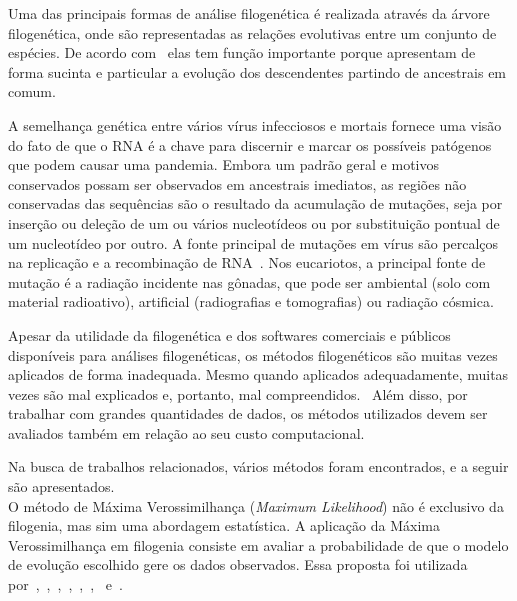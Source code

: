 \documentclass[font=plain]{abnt}
\begin{document}
Uma das principais formas de análise filogenética é realizada através da árvore filogenética, onde são representadas as relações evolutivas entre um conjunto de espécies. De acordo com~\cite{morrison_tree_thinking} elas tem função importante porque apresentam de forma sucinta e particular a evolução dos descendentes partindo de ancestrais em comum.

A semelhança genética entre vários vírus infecciosos e mortais fornece uma visão do fato de que o RNA é a chave para discernir e marcar os possíveis patógenos que podem causar uma pandemia. Embora um padrão geral e motivos conservados possam ser observados em ancestrais imediatos, as regiões não conservadas das sequências são o resultado da acumulação de mutações, seja por inserção ou deleção de um ou vários nucleotídeos ou por substituição pontual de um nucleotídeo por outro. A fonte principal de mutações em vírus são percalços na replicação e a recombinação de RNA~\cite[p. 11]{behl_threat_2022}. Nos eucariotos, a principal fonte de mutação é a radiação incidente nas gônadas, que pode ser ambiental (solo com material radioativo), artificial (radiografias e tomografias) ou radiação cósmica.

Apesar da utilidade da filogenética e dos softwares comerciais e públicos disponíveis para análises filogenéticas, os métodos filogenéticos são muitas vezes aplicados de forma inadequada. Mesmo quando aplicados adequadamente, muitas vezes são mal explicados e, portanto, mal compreendidos.~\cite[p. 1]{barry_phylogenetic_analysis_2006} Além disso, por trabalhar com grandes quantidades de dados, os métodos utilizados devem ser avaliados também em relação ao seu custo computacional.

Na busca de trabalhos relacionados, vários métodos foram encontrados, e a seguir são apresentados.\\
O método de Máxima Verossimilhança (\textit{Maximum Likelihood}) não é exclusivo da filogenia, mas sim uma abordagem estatística. A aplicação da Máxima Verossimilhança em filogenia consiste em avaliar a probabilidade de que o modelo de evolução escolhido gere os dados observados. Essa proposta foi utilizada por~\cite{fall_genetic_diversity_2021},~\cite{behl_threat_2022},~\cite{shabbir_comprehensive_2020},~\cite{hudu_hepatitis_2018},~\cite{sallard_tracing_2021},~\cite{paez-espino_diversity_evolution_2019},~\cite{tang_evolutionary_2021} e~\cite{cho_analysis_2022}.

\end{document}
